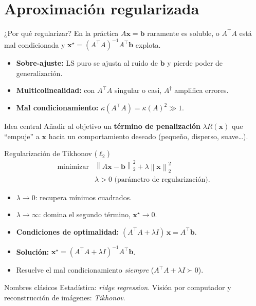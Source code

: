 \documentclass[10pt,aspectratio=169]{beamer}
\newcommand{\x}{\mathbf{x}}
\newcommand{\xb}{\mathbf{b}}
\newcommand{\0}{\mathbf{0}}
\newcommand{\1}{\mathbf{1}}
\newcommand{\norm}[1]{\left\|#1\right\|}
\begin{document}
\section{Aproximación regularizada}
\begin{frame}{¿Por qué regularizar?}
  En la práctica $A\x=\xb$ raramente es soluble, o $A^\top A$ está mal
  condicionada y $\x^\star = (A^\top A)^{-1}A^\top \xb$ explota.
  \begin{itemize}
    \item \textbf{Sobre-ajuste:} LS puro se ajusta al ruido de $\xb$ y pierde poder de generalización.
    \item \textbf{Multicolinealidad:} con $A^\top A$ singular o casi, $A^\dagger$ amplifica errores.
    \item \textbf{Mal condicionamiento:} $\kappa(A^\top A)=\kappa(A)^2\gg 1$.
  \end{itemize}
  \begin{alertblock}{Idea central}
    Añadir al objetivo un \textbf{término de penalización} $\lambda R(\x)$ que
    ``empuje'' a $\x$ hacia un comportamiento deseado (pequeño, disperso, suave\ldots).
  \end{alertblock}
\end{frame}

\begin{frame}{Regularización de Tikhonov ($\ell_2$)}
  \begin{equation*}
    \begin{array}{ll}
      \text{minimizar} & \norm{A\x - \xb}_2^2 + \lambda \norm{\x}_2^2 \\
      \text{} & \lambda > 0 \text{ (parámetro de regularización)}.
    \end{array}
  \end{equation*}
  \begin{itemize}
    \item $\lambda\to 0$: recupera mínimos cuadrados.
    \item $\lambda\to\infty$: domina el segundo término, $\x^\star\to 0$.
    \item \textbf{Condiciones de optimalidad:}
      $(A^\top A + \lambda I)\,\x = A^\top\xb$.
    \item \textbf{Solución:} $\x^\star = (A^\top A + \lambda I)^{-1}A^\top\xb$.
    \item Resuelve el mal condicionamiento \emph{siempre} ($A^\top A+\lambda I\succ 0$).
  \end{itemize}
  \begin{block}{Nombres clásicos}
    Estadística: \emph{ridge regression}. Visión por computador y
    reconstrucción de imágenes: \emph{Tikhonov}.
  \end{block}
\end{frame}
\end{document}
